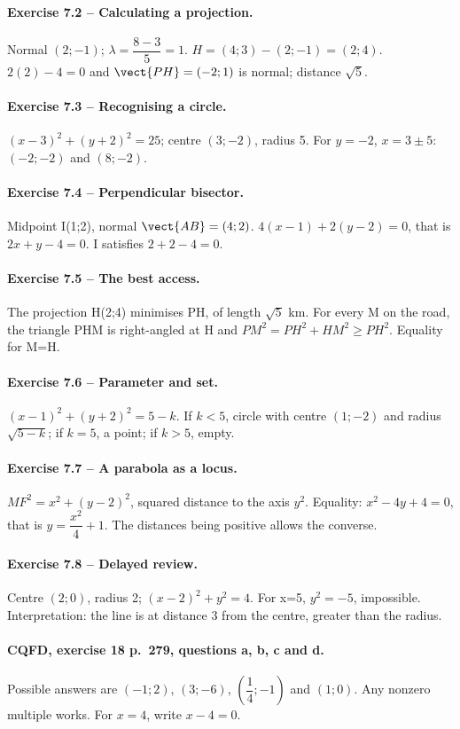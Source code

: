\paragraph{Exercise 7.2 -- Calculating a projection.} Normal $(2;-1)$; $\lambda =\dfrac{8-3}{5}=1$. $H=(4;3)-(2;-1)=(2;4)$. $2(2)-4=0$ and $\vect{PH}=(-2;1)$ is normal; distance $\sqrt5$.
\paragraph{Exercise 7.3 -- Recognising a circle.} $(x-3)^2+(y+2)^2=25$; centre $(3;-2)$, radius 5. For $y=-2$, $x=3\pm5$: $(-2;-2)$ and $(8;-2)$.
\paragraph{Exercise 7.4 -- Perpendicular bisector.} Midpoint I(1;2), normal $\vect{AB}=(4;2)$. $4(x-1)+2(y-2)=0$, that is $2x+y-4=0$. I satisfies $2+2-4=0$.
\paragraph{Exercise 7.5 -- The best access.} The projection H(2;4) minimises PH, of length $\sqrt5$ km. For every M on the road, the triangle PHM is right-angled at H and $PM^2=PH^2+HM^2\geq PH^2$. Equality for M=H.
\paragraph{Exercise 7.6 -- Parameter and set.} $(x-1)^2+(y+2)^2=5-k$. If $k<5$, circle with centre $(1;-2)$ and radius $\sqrt{5-k}$; if $k=5$, a point; if $k>5$, empty.
\paragraph{Exercise 7.7 -- A parabola as a locus.} $MF^2=x^2+(y-2)^2$, squared distance to the axis $y^2$. Equality: $x^2-4y+4=0$, that is $y=\dfrac{x^2}{4}+1$. The distances being positive allows the converse.
\paragraph{Exercise 7.8 -- Delayed review.} Centre $(2;0)$, radius 2; $(x-2)^2+y^2=4$. For x=5, $y^2=-5$, impossible. Interpretation: the line is at distance 3 from the centre, greater than the radius.
\paragraph{CQFD, exercise 18 p.~279, questions a, b, c and d.} Possible answers are $(-1;2)$, $(3;-6)$, $(\dfrac14;-1)$ and $(1;0)$. Any nonzero multiple works. For $x=4$, write $x-4=0$.
